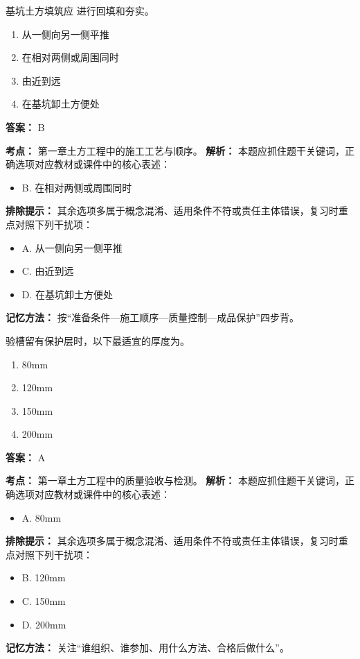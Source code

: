 \documentclass[UTF8,fontset=fandol,11pt]{ctexart}
\begin{document}
\begin{quizbox}[title={第 21 题}]
基坑土方填筑应 进行回填和夯实。\\
\begin{enumerate}[label=\Alph*.]
\item 从一侧向另一侧平推
\item 在相对两侧或周围同时
\item 由近到远
\item 在基坑卸土方便处
\end{enumerate}
\textbf{答案：} B
\vspace{0.25em}
\begin{answerbox}[title={考点解析}]
\textbf{考点：} 第一章土方工程中的施工工艺与顺序。
\textbf{解析：} 本题应抓住题干关键词，正确选项对应教材或课件中的核心表述：
\begin{itemize}
\item B. 在相对两侧或周围同时
\end{itemize}
\textbf{排除提示：} 其余选项多属于概念混淆、适用条件不符或责任主体错误，复习时重点对照下列干扰项：
\begin{itemize}
\item A. 从一侧向另一侧平推
\item C. 由近到远
\item D. 在基坑卸土方便处
\end{itemize}
\textbf{记忆方法：} 按“准备条件—施工顺序—质量控制—成品保护”四步背。
\end{answerbox}
\end{quizbox}

\begin{quizbox}[title={第 22 题}]
验槽留有保护层时，以下最适宜的厚度为。\\
\begin{enumerate}[label=\Alph*.]
\item 80mm
\item 120mm
\item 150mm
\item 200mm
\end{enumerate}
\textbf{答案：} A
\vspace{0.25em}
\begin{answerbox}[title={考点解析}]
\textbf{考点：} 第一章土方工程中的质量验收与检测。
\textbf{解析：} 本题应抓住题干关键词，正确选项对应教材或课件中的核心表述：
\begin{itemize}
\item A. 80mm
\end{itemize}
\textbf{排除提示：} 其余选项多属于概念混淆、适用条件不符或责任主体错误，复习时重点对照下列干扰项：
\begin{itemize}
\item B. 120mm
\item C. 150mm
\item D. 200mm
\end{itemize}
\textbf{记忆方法：} 关注“谁组织、谁参加、用什么方法、合格后做什么”。
\end{answerbox}
\end{quizbox}
\end{document}
